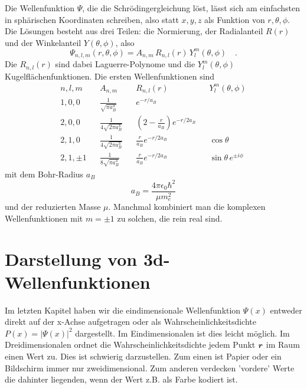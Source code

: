 Die Wellenfunktion $\Psi$, die die Schrödingergleichung löst, lässt sich am einfachsten in sphärischen Koordinaten schreiben, also statt $x,y,z$ als Funktion von $r,  \theta, \phi$. Die Lösungen besteht aus   drei Teilen: die Normierung, der Radialanteil $R(r)$ und der Winkelanteil $Y(\theta, \phi)$, also 
\begin{equation}
    \Psi_{n,l,m} (r, \theta, \phi) = A_{n,m} \, R_{n,l}(r) \, Y_l^m (\theta, \phi) \quad .
\end{equation}
Die $R_{n,l}(r)$ sind dabei Laguerre-Polynome und die $Y_l^m(\theta, \phi)$ Kugelflächenfunktionen.
Die ersten Wellenfunktionen sind
\begin{align}
    n,l,m  & & A_{n,m}                      & &R_{n,l}(r) & & Y_l^m(\theta, \phi) \\
   1,0,0   && \frac{1}{\sqrt{\pi a_B^3}}    & &e^{-r / a_B} && \\
    2,0,0  & & \frac{1}{4 \sqrt{2 \pi a_B^3}}   & & \left( 2 - \frac{r}{a_B}\right) e^{-r /2 a_B} && \\
    2,1,0  & & \frac{1}{4 \sqrt{2 \pi a_B^3}}   & & \frac{r}{a_B} e^{-r /2 a_B} && \cos \theta \\
    2,1,\pm 1  & & \frac{1}{8 \sqrt{\pi a_B^3}}   & & \frac{r}{a_B} e^{-r /2 a_B} && \sin \theta \, e^{\pm i \phi} 
\end{align}
mit dem Bohr-Radius $a_B$
\begin{equation}
    a_B = \frac{4 \pi \epsilon_0 \hbar^2}{\mu m_e^2}
\end{equation}
und der reduzierten Masse $\mu$. Manchmal kombiniert man die komplexen Wellenfunktionen mit $m = \pm 1$  zu solchen, die rein real sind. 


\section{Darstellung von 3d-Wellenfunktionen}

Im letzten Kapitel haben wir die eindimensionale Wellenfunktion $\Psi(x)$ entweder direkt auf der x-Achse aufgetragen oder als Wahrscheinlichkeitsdichte $P(x) = |\Psi(x)|^2$ dargestellt. Im Eindimensionalen ist dies leicht möglich. Im Dreidimensionalen ordnet die Wahrscheinlichkeitsdichte jedem Punkt $\boldsymbol{r}$ im Raum einen Wert zu. Dies ist schwierig darzustellen. Zum einen ist Papier oder ein Bildschirm immer nur zweidimensional. Zum anderen verdecken 'vordere' Werte die dahinter liegenden, wenn der Wert z.B. als Farbe kodiert ist.

